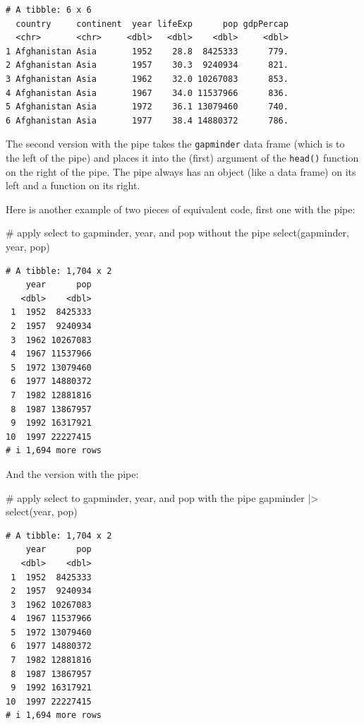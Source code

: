 \documentclass[
  letterpaper,
  DIV=11,
  numbers=noendperiod]{scrreprt}
\newenvironment{Shaded}{\begin{snugshade}}{\end{snugshade}}
\newcommand{\CommentTok}[1]{\textcolor[rgb]{0.37,0.37,0.37}{#1}}
\newcommand{\FunctionTok}[1]{\textcolor[rgb]{0.28,0.35,0.67}{#1}}
\newcommand{\NormalTok}[1]{\textcolor[rgb]{0.00,0.23,0.31}{#1}}
\newcommand{\SpecialCharTok}[1]{\textcolor[rgb]{0.37,0.37,0.37}{#1}}
\begin{document}
\begin{verbatim}
# A tibble: 6 x 6
  country     continent  year lifeExp      pop gdpPercap
  <chr>       <chr>     <dbl>   <dbl>    <dbl>     <dbl>
1 Afghanistan Asia       1952    28.8  8425333      779.
2 Afghanistan Asia       1957    30.3  9240934      821.
3 Afghanistan Asia       1962    32.0 10267083      853.
4 Afghanistan Asia       1967    34.0 11537966      836.
5 Afghanistan Asia       1972    36.1 13079460      740.
6 Afghanistan Asia       1977    38.4 14880372      786.
\end{verbatim}

The second version with the pipe takes the \texttt{gapminder} data frame
(which is to the left of the pipe) and places it into the (first)
argument of the \texttt{head()} function on the right of the pipe. The
pipe always has an object (like a data frame) on its left and a function
on its right.

Here is another example of two pieces of equivalent code, first one with
the pipe:

\begin{Shaded}
\begin{Highlighting}[]
\CommentTok{\# apply select to gapminder, year, and pop without the pipe}
\FunctionTok{select}\NormalTok{(gapminder, year, pop)}
\end{Highlighting}
\end{Shaded}

\begin{verbatim}
# A tibble: 1,704 x 2
    year      pop
   <dbl>    <dbl>
 1  1952  8425333
 2  1957  9240934
 3  1962 10267083
 4  1967 11537966
 5  1972 13079460
 6  1977 14880372
 7  1982 12881816
 8  1987 13867957
 9  1992 16317921
10  1997 22227415
# i 1,694 more rows
\end{verbatim}

And the version with the pipe:

\begin{Shaded}
\begin{Highlighting}[]
\CommentTok{\# apply select to gapminder, year, and pop with the pipe}
\NormalTok{gapminder }\SpecialCharTok{|\textgreater{}} \FunctionTok{select}\NormalTok{(year, pop)}
\end{Highlighting}
\end{Shaded}

\begin{verbatim}
# A tibble: 1,704 x 2
    year      pop
   <dbl>    <dbl>
 1  1952  8425333
 2  1957  9240934
 3  1962 10267083
 4  1967 11537966
 5  1972 13079460
 6  1977 14880372
 7  1982 12881816
 8  1987 13867957
 9  1992 16317921
10  1997 22227415
# i 1,694 more rows
\end{verbatim}
\end{document}
